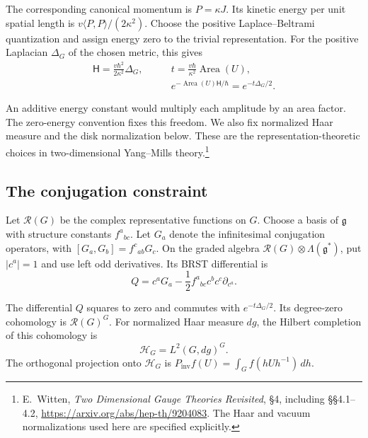 The corresponding canonical momentum is $P=\kappa J$.
Its kinetic energy per unit spatial length is
$v\langle P,P\rangle/(2\kappa^2)$.
Choose the positive Laplace--Beltrami quantization and assign energy
zero to the trivial representation. For the positive Laplacian
$\Delta_G$ of the chosen metric, this gives
\begin{equation}\label{mht:eq:prepared-heat-time}
 \begin{aligned}
 \mathsf H=\frac{v\hbar^2}{2\kappa^2}\Delta_G,
 \qquad &t=\frac{v\hbar}{\kappa^2}\operatorname{Area}(U),\\
 &e^{-\operatorname{Area}(U)\mathsf H/\hbar}=e^{-t\Delta_G/2}.
 \end{aligned}
\end{equation}

An additive energy constant would multiply each amplitude by an
area factor. The zero-energy convention fixes this freedom.
We also fix normalized Haar measure and the disk normalization below.
These are the representation-theoretic choices in two-dimensional
Yang--Mills theory.\footnote{E.~Witten, \emph{Two Dimensional Gauge
Theories Revisited}, \S4, including \S\S4.1--4.2,
\url{https://arxiv.org/abs/hep-th/9204083}. The Haar and vacuum
normalizations used here are specified explicitly.}

\subsection{The conjugation constraint}

Let $\mathcal R(G)$ be the complex representative functions on $G$.
Choose a basis of $\mathfrak g$ with structure constants
$f^a{}_{bc}$. Let $G_a$ denote the infinitesimal conjugation
operators, with $[G_a,G_b]=f^c{}_{ab}G_c$.
On the graded algebra
$\mathcal R(G)\otimes\Lambda(\mathfrak g^*)$, put
$|c^a|=1$ and use left odd derivatives. Its BRST differential is
\begin{equation}\label{mht:eq:residual-group-brst}
 Q=c^aG_a-\frac12f^a{}_{bc}c^bc^c\partial_{c^a}.
\end{equation}

\begin{proposition}\label{mht:prop:residual-group-brst}
The differential $Q$ squares to zero and commutes with
$e^{-t\Delta_G/2}$. Its degree-zero cohomology is
$\mathcal R(G)^G$. For normalized Haar measure $dg$, the Hilbert
completion of this cohomology is
\[
 \mathcal H_G=L^2(G,dg)^G.
\]
The orthogonal projection onto $\mathcal H_G$ is
$P_{\mathrm{inv}}f(U)=\int_Gf(hUh^{-1})\,dh$.
\end{proposition}

